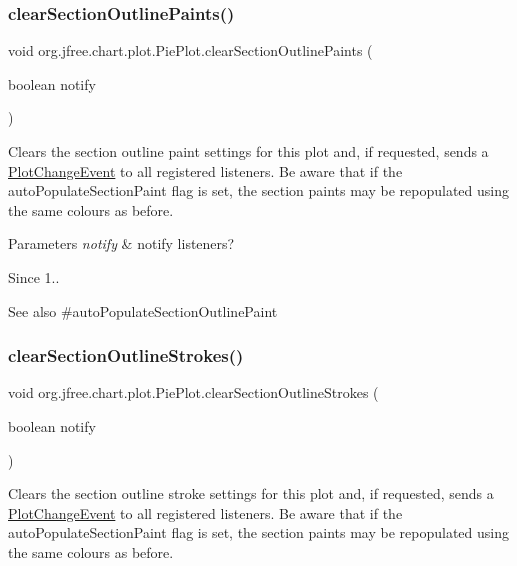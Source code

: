 \subsubsection{\texorpdfstring{clear\+Section\+Outline\+Paints()}{clearSectionOutlinePaints()}}
{\footnotesize\ttfamily void org.\+jfree.\+chart.\+plot.\+Pie\+Plot.\+clear\+Section\+Outline\+Paints (\begin{DoxyParamCaption}\item[{boolean}]{notify }\end{DoxyParamCaption})}

Clears the section outline paint settings for this plot and, if requested, sends a \mbox{\hyperlink{}{Plot\+Change\+Event}} to all registered listeners. Be aware that if the {\ttfamily auto\+Populate\+Section\+Paint} flag is set, the section paints may be repopulated using the same colours as before.


\begin{DoxyParams}{Parameters}
{\em notify} & notify listeners?\\
\hline
\end{DoxyParams}
\begin{DoxySince}{Since}
1..
\end{DoxySince}
\begin{DoxySeeAlso}{See also}
\#auto\+Populate\+Section\+Outline\+Paint 
\end{DoxySeeAlso}
\mbox{\label{classorg_1_1jfree_1_1chart_1_1plot_1_1_pie_plot_a0ac818f27f43ff90b68c7d275d02b884}} 
\subsubsection{\texorpdfstring{clear\+Section\+Outline\+Strokes()}{clearSectionOutlineStrokes()}}
{\footnotesize\ttfamily void org.\+jfree.\+chart.\+plot.\+Pie\+Plot.\+clear\+Section\+Outline\+Strokes (\begin{DoxyParamCaption}\item[{boolean}]{notify }\end{DoxyParamCaption})}

Clears the section outline stroke settings for this plot and, if requested, sends a \mbox{\hyperlink{}{Plot\+Change\+Event}} to all registered listeners. Be aware that if the {\ttfamily auto\+Populate\+Section\+Paint} flag is set, the section paints may be repopulated using the same colours as before.


